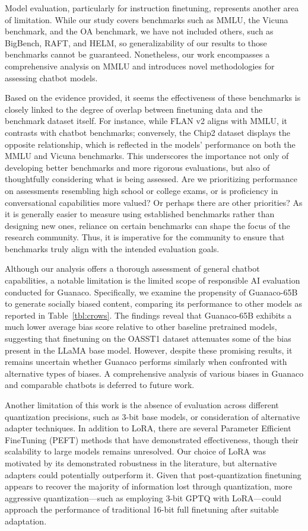Model evaluation, particularly for instruction finetuning, represents another area of limitation. While our study covers benchmarks such as MMLU, the Vicuna benchmark, and the OA benchmark, we have not included others, such as BigBench, RAFT, and HELM, so generalizability of our results to those benchmarks cannot be guaranteed. Nonetheless, our work encompasses a comprehensive analysis on MMLU and introduces novel methodologies for assessing chatbot models.

Based on the evidence provided, it seems the effectiveness of these benchmarks is closely linked to the degree of overlap between finetuning data and the benchmark dataset itself. For instance, while FLAN v2 aligns with MMLU, it contrasts with chatbot benchmarks; conversely, the Chip2 dataset displays the opposite relationship, which is reflected in the models’ performance on both the MMLU and Vicuna benchmarks. This underscores the importance not only of developing better benchmarks and more rigorous evaluations, but also of thoughtfully considering what is being assessed. Are we prioritizing performance on assessments resembling high school or college exams, or is proficiency in conversational capabilities more valued? Or perhaps there are other priorities? As it is generally easier to measure using established benchmarks rather than designing new ones, reliance on certain benchmarks can shape the focus of the research community. Thus, it is imperative for the community to ensure that benchmarks truly align with the intended evaluation goals.

Although our analysis offers a thorough assessment of general chatbot capabilities, a notable limitation is the limited scope of responsible AI evaluation conducted for {Guanaco}. Specifically, we examine the propensity of {Guanaco}-65B to generate socially biased content, comparing its performance to other models as reported in Table~\ref{tbl:crows}. The findings reveal that {Guanaco}-65B exhibits a much lower average bias score relative to other baseline pretrained models, suggesting that finetuning on the OASST1 dataset attenuates some of the bias present in the LLaMA base model. However, despite these promising results, it remains uncertain whether {Guanaco} performs similarly when confronted with alternative types of biases. A comprehensive analysis of various biases in {Guanaco} and comparable chatbots is deferred to future work.

Another limitation of this work is the absence of evaluation across different quantization precisions, such as 3-bit base models, or consideration of alternative adapter techniques. In addition to LoRA, there are several Parameter Efficient FineTuning (PEFT) methods that have demonstrated effectiveness, though their scalability to large models remains unresolved. Our choice of LoRA was motivated by its demonstrated robustness in the literature, but alternative adapters could potentially outperform it. Given that post-quantization finetuning appears to recover the majority of information lost through quantization, more aggressive quantization—such as employing 3-bit GPTQ with LoRA—could approach the performance of traditional 16-bit full finetuning after suitable adaptation.

